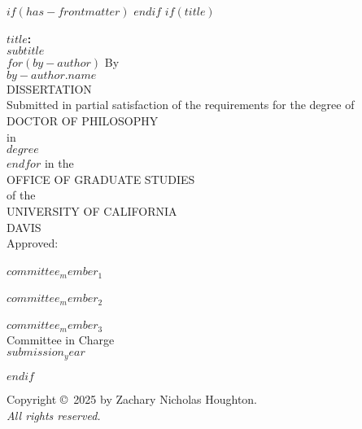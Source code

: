 $if(has-frontmatter)$
\frontmatter
$endif$
$if(title)$
\cleardoublepage
\thispagestyle{plain}
\begin{center}
   \null\vfill
   \textbf{%
      $title$:\\
	  $subtitle$
   }%
   \\
$for(by-author)$
   \bigskip
   By \\
   \bigskip
   {$by-author.name$}
\\   
   DISSERTATION \\
   \bigskip
   Submitted in partial satisfaction of the requirements for the
   degree of \\
   \bigskip
   DOCTOR OF PHILOSOPHY \\
   \bigskip
   in \\
   \bigskip
   {$degree$} \\ 
   $endfor$
   \bigskip
   in the \\
   \bigskip
   OFFICE OF GRADUATE STUDIES \\
   \bigskip        
   of the \\
   \bigskip
   UNIVERSITY OF CALIFORNIA \\
   \bigskip
   DAVIS \\
   \bigskip
   Approved: \\
   \bigskip
   \bigskip
   \makebox[3in]{\hrulefill} \\
   $committee_member_1$ \\
   \bigskip
   \bigskip
   \makebox[3in]{\hrulefill} \\
   $committee_member_2$ \\
   \bigskip
   \bigskip
   \makebox[3in]{\hrulefill} \\
   $committee_member_3$ \\
   \bigskip
   Committee in Charge \\
   \bigskip
   $submission_year$ \\
   \vfill
\end{center}
$endif$


\newpage
{}
\setcounter{savedpage}{\value{page}}

\thispagestyle{empty}
\begin{titlepage}
\begin{center}
  Copyright \copyright\ 2025 by Zachary Nicholas Houghton. \\
  \textit{All rights reserved.}
\end{center}
\end{titlepage}

\setcounter{page}{\value{savedpage}} %
\clearpage

